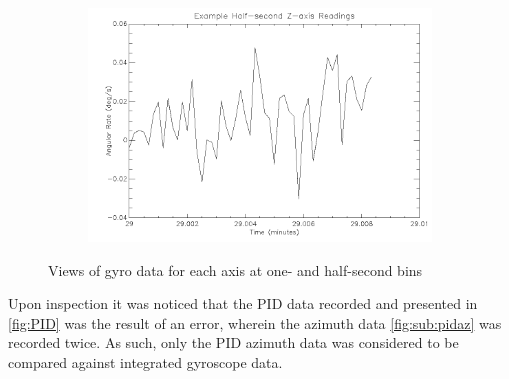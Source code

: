 \begin{figure}[htbp]
\begin{subfigure}{0.45\textwidth}
		\caption{}
		\label{fig:sub:gyroz1}
	\end{subfigure}
	\begin{subfigure}{0.45\textwidth}
		\includegraphics[width=1\linewidth]{appendix/img/campaign_results/gyrozhalfsec.png}
		\caption{}
		\label{fig:sub:gyrozh}
	\end{subfigure}
	\caption{Views of gyro data for each axis at one- and half-second bins}
	\label{fig:gyrodetail}
\end{figure}

Upon inspection it was noticed that the PID data recorded and presented in \ref{fig:PID} was the result of an error, wherein the azimuth data \ref{fig:sub:pidaz} was recorded twice. As such, only the PID azimuth data was considered to be compared against integrated gyroscope data.

